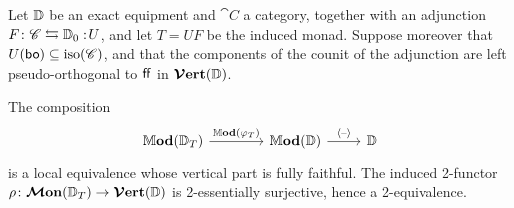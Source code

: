 \documentclass[12pt,oneside,article,draft]{memoir}
\begin{document}
\begin{theorem}\label{thm:Verts}
   Let $\mathbb{D}$ be an exact equipment and $\cat{C}$ a category, together with an adjunction
   $F\colon\mathscr{C}\leftrightarrows\mathbb{D}_0:\!U$, and let $T=UF$ be the induced monad. Suppose
   moreover that $U(\mathsf{bo})\subseteq\mathrm{iso}(\mathscr{C})$, and that the components of the counit of
   the adjunction are left pseudo-orthogonal to $\mathsf{ff}$ in $\bm{\mathcal{V}}\mathbf{ert}(\mathbb{D})$.

   The composition
   \begin{equation*}
      \begin{tikzcd}
         \dMod(\dcat{D}_T)\ar[r,"\dMod(\varphi_T)"] &[1.5em] \dMod(\dcat{D}) \ar[r,"\Col{\textrm{--}}"] & \dcat{D}
      \end{tikzcd}
   \end{equation*}
   is a local equivalence whose vertical part is fully faithful. The induced 2-functor
   $\rho\colon\bm{\mathcal{M}}\mathbf{on}(\mathbb{D}_T)\to\bm{\mathcal{V}}\mathbf{ert}(\mathbb{D})$ is 2-essentially surjective, hence a 2-equivalence.
\end{theorem}
\end{document}
